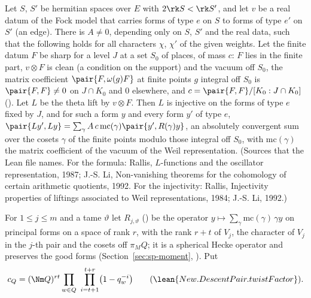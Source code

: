 \begin{fact}\label{det-chain:fact:rallis}
Let $S$, $S'$ be hermitian spaces over $E$ with $2\rk S<\rk S'$, and let $v$ be a real datum of the
Fock model that carries forms of type $e$ on $S$ to forms of type $e'$ on $S'$ (an edge). There is
$A\ne0$, depending only on $S$, $S'$ and the real data, such that the following holds for all
characters $\chi$, $\chi'$ of the given weights. Let the finite datum $F$ be sharp for a level $J$ at a
set $S_0$ of places, of mass $c$: $F$ lies in the finite part, $v\otimes F$ is clean (a condition on
the support) and the vacuum off $S_0$, the matrix coefficient
$\pair{F,\omega(g)F}$ at finite points $g$ integral off $S_0$ is $\pair{F,F}\ne0$ on $J\cap K_0$ and $0$
elsewhere, and $c=\pair{F,F}/[K_0:J\cap K_0]$ (). Let $L$ be the theta lift by $v\otimes F$. Then $L$ is injective on the forms of
type $e$ fixed by $J$, and for such a form $y$ and every form $y'$ of type $e$,
$\pair{Ly',Ly}=\sum_\gamma A\,c\,\mathrm{mc}(\gamma)\pair{y',R(\gamma)y}$, an absolutely
convergent sum over the cosets $\gamma$ of the finite points modulo those integral off $S_0$, with
$\mathrm{mc}(\gamma)$ the matrix coefficient of the vacuum of the Weil representation. (Sources
that the Lean file names. For the formula: Rallis, $L$-functions and the oscillator
representation, 1987; J.-S. Li, Non-vanishing theorems for the cohomology of certain arithmetic
quotients, 1992. For the injectivity: Rallis, Injectivity properties of liftings associated to
Weil representations, 1984; J.-S. Li, 1992.)
\end{fact}

For $1\le j\le m$ and a tame $\vartheta$ let $R_{j,\vartheta}$ () be
the operator $y\mapsto\sum_\gamma\mathrm{mc}(\gamma)\,\gamma y$ on principal forms on a space of
rank $r$, with the rank $r+t$ of $V_j$, the character of $V_j$ in the $j$-th pair and the cosets
off $\pi_MQ$; it is a spherical Hecke operator and preserves the good forms
(Section~\ref{sec:sp-moment}, ). Put
\[
  c_Q=(\Nm Q)^{rt}\prod_{w\in Q}\ \prod_{i=t+1}^{t+r}\bigl(1-q_w^{-i}\bigr)
  \qquad(\lean{New.DescentPair.twistFactor}).
\]

